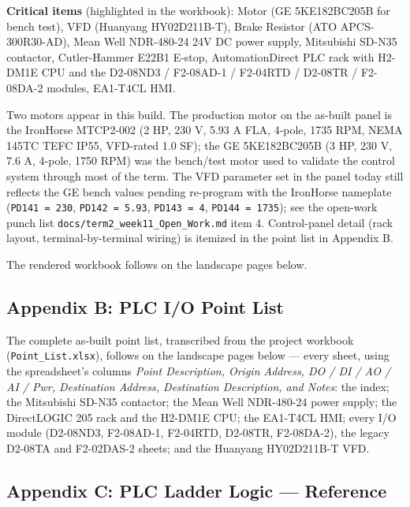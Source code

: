 \documentclass[hidelinks,12pt]{article}
\begin{document}
\textbf{Critical items} (highlighted in the workbook): Motor (GE 5KE182BC205B for bench
test), VFD (Huanyang HY02D211B-T), Brake Resistor (ATO APCS-300R30-AD), Mean Well
NDR-480-24 24V DC power supply, Mitsubishi SD-N35 contactor, Cutler-Hammer E22B1
E-stop, AutomationDirect PLC rack with H2-DM1E CPU and the D2-08ND3 / F2-08AD-1 /
F2-04RTD / D2-08TR / F2-08DA-2 modules, EA1-T4CL HMI.

Two motors appear in this build. The production motor on the as-built panel is the IronHorse MTCP2-002 (2 HP, 230 V, 5.93 A FLA, 4-pole, 1735 RPM, NEMA 145TC TEFC IP55, VFD-rated 1.0 SF); the GE 5KE182BC205B (3 HP, 230 V, 7.6 A, 4-pole, 1750 RPM) was the bench/test motor used to validate the control system through most of the term. The VFD parameter set in the panel today still reflects the GE bench values pending re-program with the IronHorse nameplate (\texttt{PD141 = 230}, \texttt{PD142 = 5.93}, \texttt{PD143 = 4}, \texttt{PD144 = 1735}); see the open-work punch list \texttt{docs/term2\_week11\_Open\_Work.md} item 4. Control-panel detail (rack layout, terminal-by-terminal wiring) is itemized in the point list in Appendix B.

The rendered workbook follows on the landscape pages below.



\subsection{Appendix B: PLC I/O Point List}
The complete as-built point list, transcribed from the project workbook
(\texttt{Point\_List.xlsx}), follows on the landscape pages below --- every sheet, using
the spreadsheet's columns \emph{Point Description, Origin Address, DO / DI / AO / AI /
Pwr, Destination Address, Destination Description, and Notes}: the index; the Mitsubishi
SD-N35 contactor; the Mean Well NDR-480-24 power supply; the DirectLOGIC 205 rack and
the H2-DM1E CPU; the EA1-T4CL HMI; every I/O module (D2-08ND3, F2-08AD-1, F2-04RTD,
D2-08TR, F2-08DA-2), the legacy D2-08TA and F2-02DAS-2 sheets; and the Huanyang
HY02D211B-T VFD.



\subsection{Appendix C: PLC Ladder Logic --- Reference}
\label{sec:appendix_rungs}
\end{document}
